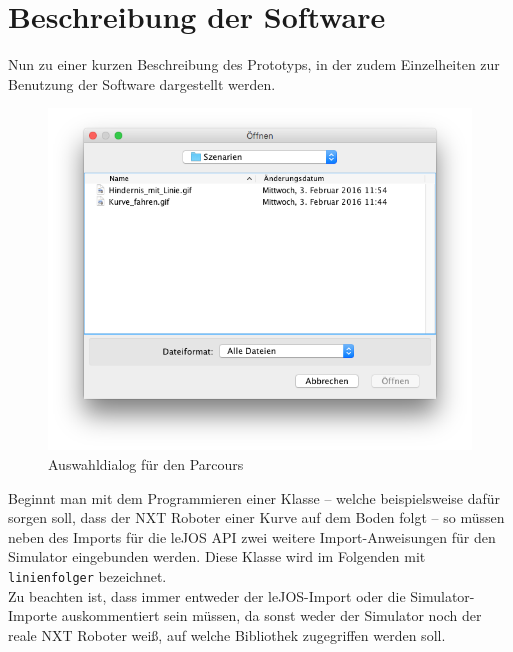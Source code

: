 \documentclass[paper=a4, DIV=calc, BCOR=12mm, twoside=on, onecolumn=on, open = right, titlepage =on, parskip =half-, headsepline = on, footsepline = off, chapterprefix = off, appendixprefix = on, fontsize = 12pt, numbers = noenddot, abstract = on]{scrbook}
\begin{document}
\par \singlespacing
\section{Beschreibung der Software}
\onehalfspacing

Nun zu einer kurzen Beschreibung des Prototyps, in der zudem Einzelheiten zur Benutzung der Software dargestellt werden.



\begin{figure}[htbp]
\centering
\includegraphics[width=\textwidth]{images/dialog_szenarien.png} 
\caption{Auswahldialog für den Parcours}
\label{fig:auswahldialog}
\end{figure}

Beginnt man mit dem Programmieren einer Klasse -- welche beispielsweise dafür sorgen soll, dass der NXT Roboter einer Kurve auf dem Boden folgt -- so müssen neben des Imports für die leJOS API zwei weitere Import-Anweisungen für den Simulator eingebunden werden. Diese Klasse wird im Folgenden mit \texttt{linienfolger} bezeichnet.\\
Zu beachten ist, dass immer entweder der leJOS-Import oder die Simulator-Importe auskommentiert sein müssen, da sonst weder der Simulator noch der reale NXT Roboter weiß, auf welche Bibliothek zugegriffen werden soll.
\end{document}
